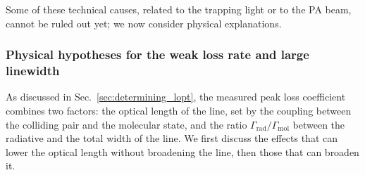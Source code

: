Some of these technical causes, related to the trapping light or to the PA beam, cannot be ruled out yet; we now consider physical explanations.

\subsubsection{Physical hypotheses for the weak loss rate and large linewidth}
\label{sec:physical_hypotheses}
As discussed in Sec.~\ref{sec:determining_lopt}, the measured peak loss coefficient combines two factors: the optical length of the line, set by the coupling between the colliding pair and the molecular state, and the ratio $\Gamma_{\text{rad}}/\Gamma_{\text{mol}}$ between the radiative and the total width of the line. We first discuss the effects that can lower the optical length without broadening the line, then those that can broaden it.

